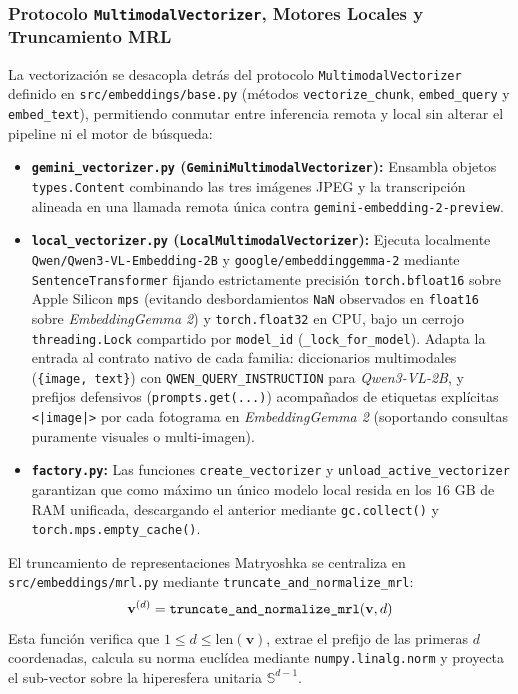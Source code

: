 \subsubsection{Protocolo \texttt{MultimodalVectorizer}, Motores Locales y Truncamiento MRL}
La vectorización se desacopla detrás del protocolo \texttt{MultimodalVectorizer} definido en \texttt{src/\allowbreak embeddings/\allowbreak base.py} (métodos \texttt{vectorize\_chunk}, \texttt{embed\_query} y \texttt{embed\_text}), permitiendo conmutar entre inferencia remota y local sin alterar el pipeline ni el motor de búsqueda:
\begin{itemize}
    \item \textbf{\texttt{gemini\_vectorizer.py} (\texttt{GeminiMultimodalVectorizer}):} Ensambla objetos \texttt{types.Content} combinando las tres imágenes JPEG y la transcripción alineada en una llamada remota única contra \texttt{gemini-embedding-2-preview}.
    \item \textbf{\texttt{local\_vectorizer.py} (\texttt{LocalMultimodalVectorizer}):} Ejecuta localmente \texttt{Qwen/\allowbreak Qwen3-VL-\allowbreak Embedding-2B} y \texttt{google/\allowbreak embeddinggemma-2} mediante \texttt{SentenceTransformer} fijando estrictamente precisión \texttt{torch.\allowbreak bfloat16} sobre Apple Silicon \texttt{mps} (evitando desbordamientos \texttt{NaN} observados en \texttt{float16} sobre \textit{EmbeddingGemma 2}) y \texttt{torch.\allowbreak float32} en CPU, bajo un cerrojo \texttt{threading.Lock} compartido por \texttt{model\_id} (\texttt{\_lock\_\allowbreak for\_\allowbreak model}). Adapta la entrada al contrato nativo de cada familia: diccionarios multimodales (\texttt{\{image, text\}}) con \texttt{QWEN\_\allowbreak QUERY\_\allowbreak INSTRUCTION} para \textit{Qwen3-VL-2B}, y prefijos defensivos (\texttt{prompts.get(...)}) acompañados de etiquetas explícitas \texttt{<|image|>} por cada fotograma en \textit{EmbeddingGemma 2} (soportando consultas puramente visuales o multi-imagen).
    \item \textbf{\texttt{factory.py}:} Las funciones \texttt{create\_vectorizer} y \texttt{unload\_active\_vectorizer} garantizan que como máximo un único modelo local resida en los $16\text{ GB}$ de RAM unificada, descargando el anterior mediante \texttt{gc.collect()} y \texttt{torch.mps.empty\_cache()}.
\end{itemize}

El truncamiento de representaciones Matryoshka se centraliza en \texttt{src/embeddings/mrl.py} mediante \texttt{truncate\_and\_normalize\_mrl}:
\begin{equation}
    \mathbf{v}^{(d)} = \text{\texttt{truncate\_and\_normalize\_mrl}}(\mathbf{v}, d)
\end{equation}
Esta función verifica que $1 \le d \le \text{len}(\mathbf{v})$, extrae el prefijo de las primeras $d$ coordenadas, calcula su norma euclídea mediante \texttt{numpy.linalg.norm} y proyecta el sub-vector sobre la hiperesfera unitaria $\mathbb{S}^{d-1}$.

